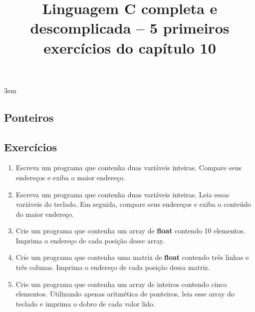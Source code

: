 \documentclass[a4paper,10pt]{article}
\title{Linguagem C completa e descomplicada -- 5 primeiros exercícios do capítulo 10}
\begin{document}
\maketitle

\emergencystretch 3em

\begin{multicols*}{2}
\setcounter{section}{9}
\section{Ponteiros}

\setcounter{subsection}{6}
\subsection{Exercícios}

\setlength{\leftmargini}{0pt}
\begin{enumerate}
  \item Escreva um programa que contenha duas variáveis inteiras. Compare seus endereços e exiba o maior endereço.
  \item Escreva um programa que contenha duas variáveis inteiras. Leia essas variáveis do teclado. Em seguida, compare seus endereços e exiba o conteúdo do maior endereço.
  \item Crie um programa que contenha um array de \textbf{float} contendo 10 elementos. Imprima o endereço de cada posição desse array.
  \item Crie um programa que contenha uma matriz de \textbf{float} contendo três linhas e três colunas. Imprima o endereço de cada posição dessa matriz.
  \item Crie um programa que contenha um array de inteiros contendo cinco elementos. Utilizando apenas aritmética de ponteiros, leia esse array do teclado e imprima o dobro de cada valor lido.
\end{enumerate}
\end{multicols*}
\end{document}
